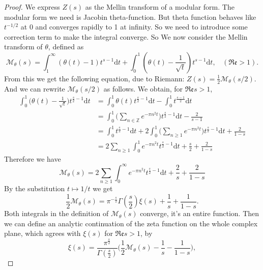 \documentclass[12pt,a4paper,english]{article}
\theoremstyle{plain}
\theoremstyle{definition}
\begin{document}
\begin{proof}
We express $Z(s)$ as the Mellin transform of a modular form. The modular form we need is Jacobin theta-function. But theta function behaves like $t^{-1/2}$ at 0 and converges rapidly to 1 at infinity. So we need to introduce some correction term to make the integral converge. So We now consider the Mellin transform of $\theta$, defined as \begin{equation*}
    \mathcal{M}_{\theta}(s)=\int^{\infty}_{1}(\theta(t)-1)t^{s-1}\text{d}t+\int^{1}_{0}(\theta(t)-\frac{1}{\sqrt{t}})t^{s-1}\text{d}t,\ \ \ \ (\mathfrak{Re}> 1).
\end{equation*}
From this we get the following equation, due to Riemann: $Z(s)=\frac{1}{2}\mathcal{M}_{\theta}(s/2)$. And we can rewrite $\mathcal{M}_{\theta}(s/2)$ as follows.  We obtain, for $\mathfrak{Re}s>1$, 
\begin{align*}
\int^{1}_{0}\bigg(\theta(t)-\frac{1}{\sqrt{t}}\bigg)t^{\frac{s}{2}-1}\text{d}t
&= \int^{1}_{0}\theta(t)t^{\frac{s}{2}-1}\text{d}t-\int^{1}_{0}t^{\frac{s-1}{2}}\text{d}t\\
&= \int^{1}_{0}\bigg(\sum_{n\in\mathbb{Z}}e^{-\pi n^{2}t}\bigg)t^{\frac{s}{2}-1}\text{d}t-\frac{2}{s-1}\\
&= \int^{1}_{0}t^{\frac{s}{2}-1}\text{d}t+2\int^{1}_{0}\bigg(\sum_{n\geq 1}e^{-\pi n^{2}t}\bigg)t^{\frac{s}{2}-1}\text{d}t +\frac{2}{1-s}\\
&= 2\sum_{n\geq 1}\int^{1}_{0}e^{-\pi n^{2}t}t^{\frac{s}{2}-1}\text{d}t+\frac{s}{2}+\frac{2}{1-s}
\end{align*}
Therefore we have
\begin{equation*}
    \mathcal{M}_{\theta}(s)=2\sum_{n\geq1}\int^{\infty}_{0}e^{-\pi n^{2}t}t^{\frac{s}{2}-1}\text{d}t+\frac{2}{s}+\frac{2}{1-s}
\end{equation*}
By the substitution $t\mapsto 1/t$ we get
\begin{equation*}
    \frac{1}{2}\mathcal{M}_{\theta}(s)=\pi^{-\frac{s}{2}}\Gamma(\frac{s}{2})\xi(s)+\frac{1}{s}+\frac{1}{1-s}.
\end{equation*}
Both integrals in the definition of $\mathcal{M}_{\theta}(s)$ converge, it's an entire function. Then we can define an analytic continuation of the zeta function on the whole complex plane, which agrees with $\xi(s)$ for $\mathfrak{Re}s>1$, by 
\begin{equation*}
    \xi(s)=\frac{\pi^{\frac{s}{2}}}{\Gamma(\frac{s}{2})}\bigg(\frac{1}{2}\mathcal{M}_{\theta}(s)-\frac{1}{s}-\frac{1}{1-s}\bigg),
\end{equation*}

\end{proof}
\end{document}
